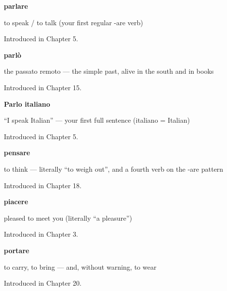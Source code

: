 \noindent\begin{minipage}[t]{\linewidth}
\raggedright
\textbf{parlare}\par
\small to speak / to talk (your first regular -are verb)\par
\footnotesize Introduced in Chapter 5.
\end{minipage}\par\medskip

\noindent\begin{minipage}[t]{\linewidth}
\raggedright
\textbf{parlò}\par
\small the passato remoto — the simple past, alive in the south and in books\par
\footnotesize Introduced in Chapter 15.
\end{minipage}\par\medskip

\noindent\begin{minipage}[t]{\linewidth}
\raggedright
\textbf{Parlo italiano}\par
\small \textquotedblleft{}I speak Italian\textquotedblright{} — your first full sentence (italiano = Italian)\par
\footnotesize Introduced in Chapter 5.
\end{minipage}\par\medskip

\noindent\begin{minipage}[t]{\linewidth}
\raggedright
\textbf{pensare}\par
\small to think — literally \textquotedblleft{}to weigh out\textquotedblright{}, and a fourth verb on the -are pattern\par
\footnotesize Introduced in Chapter 18.
\end{minipage}\par\medskip

\noindent\begin{minipage}[t]{\linewidth}
\raggedright
\textbf{piacere}\par
\small pleased to meet you (literally \textquotedblleft{}a pleasure\textquotedblright{})\par
\footnotesize Introduced in Chapter 3.
\end{minipage}\par\medskip

\noindent\begin{minipage}[t]{\linewidth}
\raggedright
\textbf{portare}\par
\small to carry, to bring — and, without warning, to wear\par
\footnotesize Introduced in Chapter 20.
\end{minipage}\par\medskip

